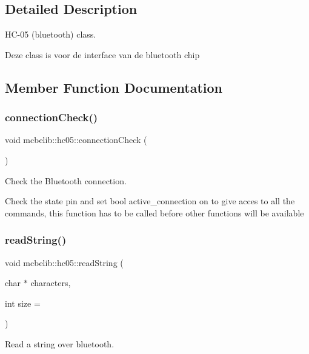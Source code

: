 \subsection{Detailed Description}
H\+C-\/05 (bluetooth) class. 

Deze class is voor de interface van de bluetooth chip 

\subsection{Member Function Documentation}
\mbox{\label{classmcbelib_1_1hc05_a48d294a72ba90a9cd6573da553fc7823}} 
\subsubsection{\texorpdfstring{connection\+Check()}{connectionCheck()}}
{\footnotesize\ttfamily void mcbelib\+::hc05\+::connection\+Check (\begin{DoxyParamCaption}{ }\end{DoxyParamCaption})}



Check the Bluetooth connection. 

Check the state pin and set bool active\+\_\+connection on to give acces to all the commands, this function has to be called before other functions will be available \mbox{\label{classmcbelib_1_1hc05_a4786907ca61b495eb7a7453f8787286e}} 
\subsubsection{\texorpdfstring{read\+String()}{readString()}}
{\footnotesize\ttfamily void mcbelib\+::hc05\+::read\+String (\begin{DoxyParamCaption}\item[{char $\ast$}]{characters,  }\item[{int}]{size = {} }\end{DoxyParamCaption})}



Read a string over bluetooth. 

